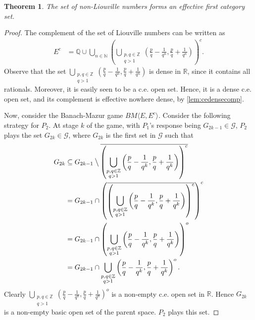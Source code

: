 \documentclass[10pt,a4paper]{amsart}
\newtheorem{theorem}{Theorem}
\newcommand{\N}{\mathbb{N}}
\begin{document}
\begin{theorem}
	The set of non-Liouville numbers forms an effective first category set. 
\end{theorem}

\begin{proof}
The complement of the set of Liouville numbers can be written as
\begin{align*}
  E^c&=\mathbb{Q} \cup \bigcup_{n\in\N}
       \left(\bigcup_{\substack{p,q\in\mathbb{Z}\\q>1}}
  \left(\frac{p}{q}-\frac{1}{q^n},\frac{p}{q}+\frac{1}{q^n}\right)\right)^c.  
\end{align*} 
Observe that the set
$\bigcup_{\substack{p,q\in\mathbb{Z}\\q>1}}\left(\frac{p}{q}-\frac{1}{q^n},\frac{p}{q}+\frac{1}{q^n}\right)$ 
is dense in $\mathbb{R}$, since it contains all rationals. Moreover,
it is easily seen to be a c.e. open set. Hence, it is a dense c.e.
open set, and its complement is effective nowhere dense, by
\cref{lem:cedensecomp}.

Now, consider the Banach-Mazur game $BM\langle E,E^c \rangle$.
Consider the following strategy for $P_2$. At stage $k$ of the game,
with $P_1$'s response being $G_{2k-1}\in\mathcal{G}$, $P_2$ plays the
set $G_{2k}\in\mathcal{G}$, where $G_{2k}$ is the first set in
$\mathcal{G}$ such that
\begin{align*}
  G_{2k}&\subseteq G_{2k-1}\mathbin{\big\backslash}\overline{\left(\bigcup_{\substack{p,q\in\mathbb{Z}\\q>1}}\left(\frac{p}{q}-\frac{1}{q^k},\frac{p}{q}+\frac{1}{q^k}\right)\right)^c}\\
	&=G_{2k-1}\cap\left(\overline{\left(\bigcup_{\substack{p,q\in\mathbb{Z}\\q>1}}\left(\frac{p}{q}-\frac{1}{q^k},\frac{p}{q}+\frac{1}{q^k}\right)\right)^c}\right)^c\\
	&=G_{2k-1}\cap\left(\bigcup_{\substack{p,q\in\mathbb{Z}\\q>1}}\left(\frac{p}{q}-\frac{1}{q^k},\frac{p}{q}+\frac{1}{q^k}\right)\right)^o\\
	&=G_{2k-1}\cap\bigcup_{\substack{p,q\in\mathbb{Z}\\q>1}}\left(\frac{p}{q}-\frac{1}{q^k},\frac{p}{q}+\frac{1}{q^k}\right)^o.
\end{align*}
Clearly
$\bigcup_{\substack{p,q\in\mathbb{Z}\\q>1}}\left(\frac{p}{q}-\frac{1}{q^n},\frac{p}{q}+\frac{1}{q^n}\right)^o$
is a non-empty c.e. open set in $\mathbb{R}$. Hence $G_{2k}$ is a
non-empty basic open set of the parent space. $P_2$ plays this set.


\end{proof}
\end{document}
